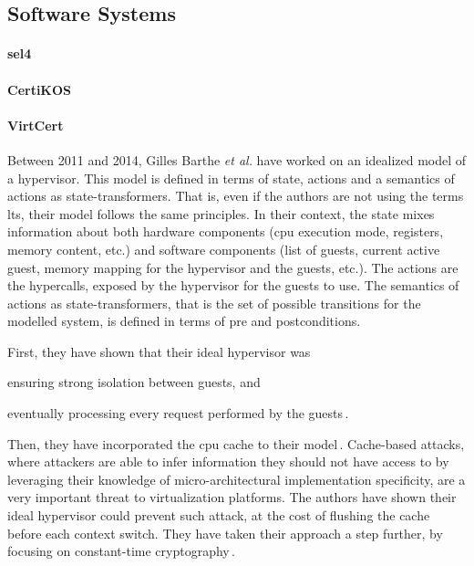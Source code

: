 \subsection{Software Systems}

\paragraph{sel4}

\paragraph{CertiKOS}

\paragraph{VirtCert}
%
Between 2011 and 2014, Gilles Barthe \emph{et al.} have worked on an idealized
model of a hypervisor.
%
This model is defined in terms of state, actions and a semantics of actions as
state-trans\-formers.
%
That is, even if the authors are not using the terms \ac{lts}, their model
follows the same principles.
%
In their context, the state mixes information about both hardware components
(\ac{cpu} execution mode, registers, memory content, etc.) and software
components (list of guests, current active guest, memory mapping for the
hypervisor and the guests, etc.).
%
The actions are the hypercalls, exposed by the hypervisor for the guests to use.
%
The semantics of actions as state-transformers, that is the set of possible
transitions for the modelled system, is defined in terms of pre and
postconditions.

First, they have shown that their ideal hypervisor was
%
\begin{inparaenum}[(1)]
\item ensuring strong isolation between guests, and
%
\item eventually processing every request performed by the
  guests\,\cite{barthe2011virtcert1}.
\end{inparaenum}
%
Then, they have incorporated the \ac{cpu} cache to their
model\,\cite{barthe2012virtcert2}.
%
Cache-based attacks, where attackers are able to infer information they should
not have access to by leveraging their knowledge of micro-architectural
implementation specificity, are a very important threat to virtualization
platforms.
%
The authors have shown their ideal hypervisor could prevent such attack, at the
cost of flushing the cache before each context switch.
%
They have taken their approach a step further, by focusing on constant-time
cryptography\,\cite{barthe2014virtcert3}.

